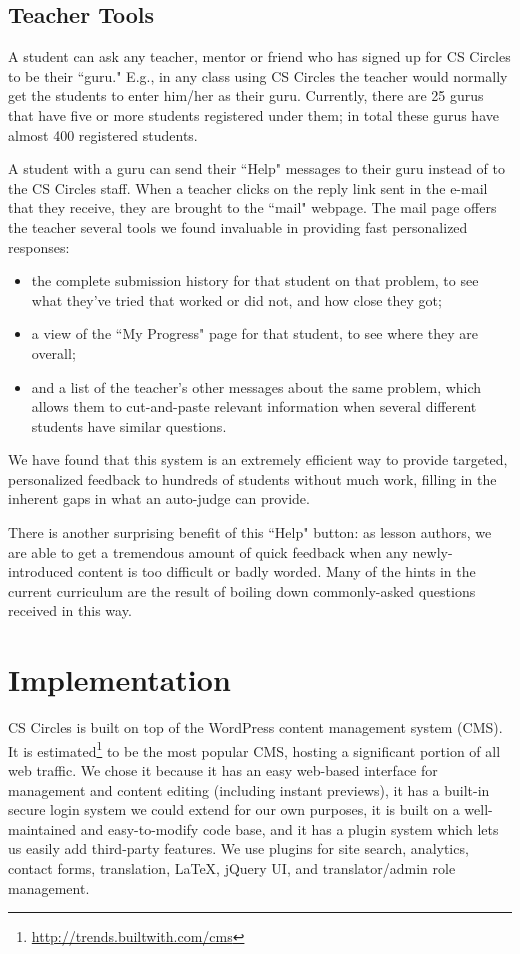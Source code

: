 \documentclass{article}
\newcommand{\usanon}[2]{#1}
\begin{document}
{\subsection{Teacher Tools}
A student can ask any teacher, mentor or friend who has signed up for CS Circles to be their ``guru." E.g., in any class using CS Circles the teacher would normally get the students to enter him/her as their guru. Currently, there are 25 gurus that have five or more students registered under them; in total these gurus have almost 400 registered students.

A student with a guru can send their ``Help" messages to their guru instead of to the CS Circles staff. When a teacher clicks on the reply link sent in the e-mail that they receive, they are brought to the ``mail" webpage. The mail page offers the teacher several tools we found invaluable in providing fast personalized responses:
\begin{itemize}
\item the complete submission history for that student on that problem, to see what they've tried that worked or did not, and how close they got;
\item a view of the ``My Progress" page for that student, to see where they are overall;
\item and a list of the teacher's other messages about the same problem, which allows them to cut-and-paste relevant information when several different students have similar questions.
\end{itemize}
We have found that this system is an extremely efficient way to provide targeted, personalized feedback to hundreds of students without much work, filling in the inherent gaps in what an auto-judge can provide.

There is another surprising benefit of this ``Help" button: as lesson authors, we are able to get a tremendous amount of quick feedback when any newly-introduced content is too difficult or badly worded. Many of the hints in the current curriculum are the result of boiling down commonly-asked questions received in this way.

\usanon{}{\eject}
\section{Implementation}\label{sec:implementation}
CS Circles is built on top of the WordPress content management system (CMS). It is estimated\footnote{\url{http://trends.builtwith.com/cms}} to be the most popular CMS, hosting a significant portion of all web traffic. We chose it because it has an easy web-based interface for management and content editing (including instant previews), it has a built-in secure login system we could extend for our own purposes, it is built on a well-maintained and easy-to-modify code base, and it has a plugin system which lets us easily add third-party features. We use plugins for site search, analytics, contact forms, translation, \LaTeX, jQuery UI, and translator/admin role management.

}
\end{document}
